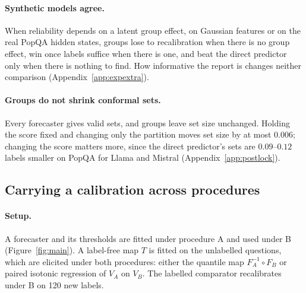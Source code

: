 \documentclass[11pt]{article}
\theoremstyle{definition}
\theoremstyle{remark}
\newcommand{\1}{\mathbf{1}}
\begin{document}
\paragraph{Synthetic models agree.}  When reliability depends on a latent group effect, on Gaussian features or
on the real PopQA hidden states, groups lose to recalibration when there is no group effect, win once labels
suffice when there is one, and beat the direct predictor only when there is nothing to find. How informative
the report is changes neither comparison (Appendix~\ref{app:expextra}).

\paragraph{Groups do not shrink conformal sets.}  Every forecaster gives valid sets, and groups leave set size
unchanged. Holding the score fixed and changing only the partition moves set size by at most $0.006$; changing
the score matters more, since the direct predictor's sets are $0.09$--$0.12$ labels smaller on PopQA for Llama
and Mistral (Appendix~\ref{app:postlock}).

\subsection{Carrying a calibration across procedures}
\label{sec:exp-transport}
\paragraph{Setup.} A forecaster and its thresholds are fitted under procedure A and used under B
(Figure~\ref{fig:main}). A label-free map $T$ is fitted on the unlabelled questions, which are elicited under
both procedures: either the quantile map $F_A^{-1}\circ F_B$ or paired isotonic regression of $V_A$ on $V_B$.
The labelled comparator recalibrates under B on 120 new labels.
\end{document}
